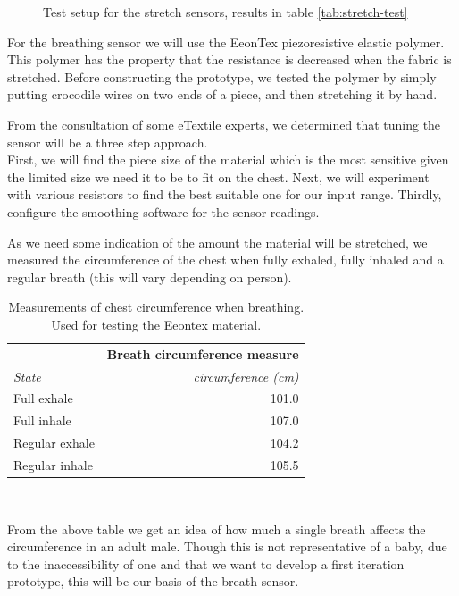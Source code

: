 \documentclass{sigchi-ext}
\begin{document}
{{\begin{minipage}{0.925\marginparwidth}
\begin{figure} [H]
    \caption{Test setup for the stretch sensors, results in table \ref{tab:stretch-test}}
\end{figure}
    \end{minipage}}\label{sec:sidebar} }

For the breathing sensor we will use the EeonTex piezoresistive elastic polymer.
This polymer has the property that the resistance is decreased when the fabric
is stretched.
Before constructing the prototype, we tested the polymer by simply putting
crocodile wires on two ends of a piece, and then stretching it by hand.

From the consultation of some eTextile experts, we determined
that tuning the sensor will be a three step approach.\\
First, we will find the piece size of the material which
is the most sensitive given the limited size we need it to be
to fit on the chest. Next, we will experiment with various
resistors to find the best suitable one for our input range.
Thirdly, configure the smoothing software for the sensor readings.

As we need some indication of the amount the material will
be stretched, we measured the circumference of the chest
when fully exhaled, fully inhaled and a regular breath
(this will vary depending on person).

\begin{table}[H]
  \centering
  \begin{tabular}{l r}
    & \multicolumn{1}{l}{\small{\textbf{Breath circumference measure}}} \\
    \cmidrule(r){1-2}
    {\small\textit{State}}
    & {\small \textit{circumference (cm)}} \\
    \midrule
    Full exhale    & 101.0 \\
    Full inhale    & 107.0 \\
    Regular exhale & 104.2 \\
    Regular inhale & 105.5  \\
  \end{tabular}
  \caption{Measurements of chest circumference when breathing. Used for testing the Eeontex material.}~\label{tab:circumference}
\end{table}
From the above table we get an idea of how much a single breath affects the circumference
in an adult male. Though this is not representative of a baby, due to the
inaccessibility of one and that we want to develop a first iteration prototype, this
will be our basis of the breath sensor.
\end{document}

